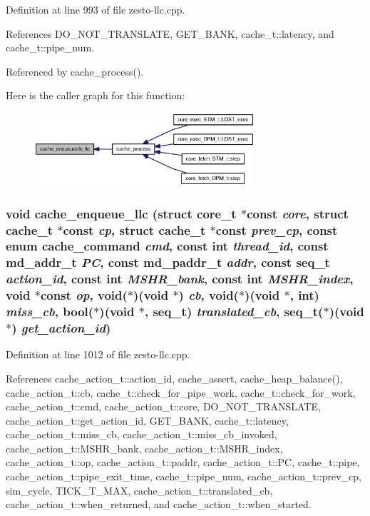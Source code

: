 Definition at line 993 of file zesto-llc.cpp.

References DO\_\-NOT\_\-TRANSLATE, GET\_\-BANK, cache\_\-t::latency, and cache\_\-t::pipe\_\-num.

Referenced by cache\_\-process().

Here is the caller graph for this function:\nopagebreak
\begin{figure}[H]
\begin{center}
\leavevmode
\includegraphics[width=232pt]{zesto-llc_8cpp_17919e2800a0393570b40f08156cb42c_icgraph}
\end{center}
\end{figure}
\subsubsection[{cache\_\-enqueue\_\-llc}]{\setlength{\rightskip}{0pt plus 5cm}void cache\_\-enqueue\_\-llc (struct {\bf core\_\-t} $\ast$const  {\em core}, \/  struct {\bf cache\_\-t} $\ast$const  {\em cp}, \/  struct {\bf cache\_\-t} $\ast$const  {\em prev\_\-cp}, \/  const enum {\bf cache\_\-command} {\em cmd}, \/  const int {\em thread\_\-id}, \/  const {\bf md\_\-addr\_\-t} {\em PC}, \/  const {\bf md\_\-paddr\_\-t} {\em addr}, \/  const {\bf seq\_\-t} {\em action\_\-id}, \/  const int {\em MSHR\_\-bank}, \/  const int {\em MSHR\_\-index}, \/  void $\ast$const  {\em op}, \/  void($\ast$)(void $\ast$) {\em cb}, \/  void($\ast$)(void $\ast$, int) {\em miss\_\-cb}, \/  bool($\ast$)(void $\ast$, {\bf seq\_\-t}) {\em translated\_\-cb}, \/  {\bf seq\_\-t}($\ast$)(void $\ast$) {\em get\_\-action\_\-id})}\label{zesto-llc_8cpp_6955e78ccb0fb1511754e8cd113e1dcc}




Definition at line 1012 of file zesto-llc.cpp.

References cache\_\-action\_\-t::action\_\-id, cache\_\-assert, cache\_\-heap\_\-balance(), cache\_\-action\_\-t::cb, cache\_\-t::check\_\-for\_\-pipe\_\-work, cache\_\-t::check\_\-for\_\-work, cache\_\-action\_\-t::cmd, cache\_\-action\_\-t::core, DO\_\-NOT\_\-TRANSLATE, cache\_\-action\_\-t::get\_\-action\_\-id, GET\_\-BANK, cache\_\-t::latency, cache\_\-action\_\-t::miss\_\-cb, cache\_\-action\_\-t::miss\_\-cb\_\-invoked, cache\_\-action\_\-t::MSHR\_\-bank, cache\_\-action\_\-t::MSHR\_\-index, cache\_\-action\_\-t::op, cache\_\-action\_\-t::paddr, cache\_\-action\_\-t::PC, cache\_\-t::pipe, cache\_\-action\_\-t::pipe\_\-exit\_\-time, cache\_\-t::pipe\_\-num, cache\_\-action\_\-t::prev\_\-cp, sim\_\-cycle, TICK\_\-T\_\-MAX, cache\_\-action\_\-t::translated\_\-cb, cache\_\-action\_\-t::when\_\-returned, and cache\_\-action\_\-t::when\_\-started.

